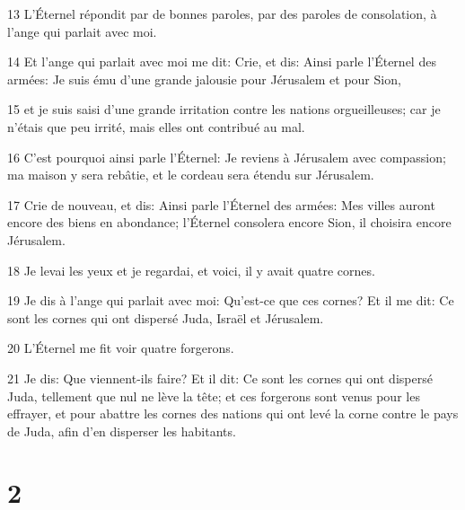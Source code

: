 \par 13 L'Éternel répondit par de bonnes paroles, par des paroles de consolation, à l'ange qui parlait avec moi.
\par 14 Et l'ange qui parlait avec moi me dit: Crie, et dis: Ainsi parle l'Éternel des armées: Je suis ému d'une grande jalousie pour Jérusalem et pour Sion,
\par 15 et je suis saisi d'une grande irritation contre les nations orgueilleuses; car je n'étais que peu irrité, mais elles ont contribué au mal.
\par 16 C'est pourquoi ainsi parle l'Éternel: Je reviens à Jérusalem avec compassion; ma maison y sera rebâtie, et le cordeau sera étendu sur Jérusalem.
\par 17 Crie de nouveau, et dis: Ainsi parle l'Éternel des armées: Mes villes auront encore des biens en abondance; l'Éternel consolera encore Sion, il choisira encore Jérusalem.
\par 18 Je levai les yeux et je regardai, et voici, il y avait quatre cornes.
\par 19 Je dis à l'ange qui parlait avec moi: Qu'est-ce que ces cornes? Et il me dit: Ce sont les cornes qui ont dispersé Juda, Israël et Jérusalem.
\par 20 L'Éternel me fit voir quatre forgerons.
\par 21 Je dis: Que viennent-ils faire? Et il dit: Ce sont les cornes qui ont dispersé Juda, tellement que nul ne lève la tête; et ces forgerons sont venus pour les effrayer, et pour abattre les cornes des nations qui ont levé la corne contre le pays de Juda, afin d'en disperser les habitants.

\chapter{2}

